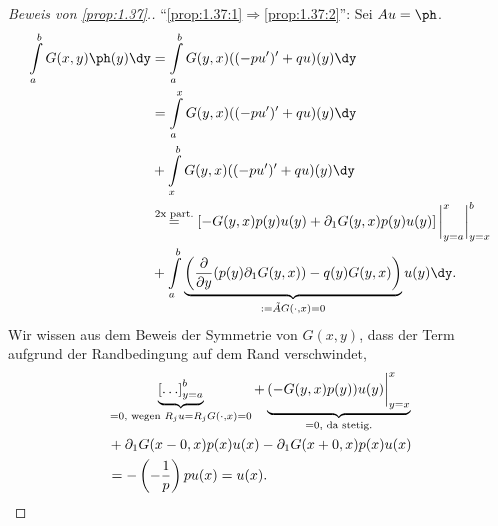 \begin{proof}[Beweis von \ref{prop:1.37}.]
``\ref{prop:1.37:1}$\Rightarrow$\ref{prop:1.37:2}'': Sei $Au = \ph$.
\begin{align*}
\int\limits_a^b G(x,y)\ph(y)\dy &= \int\limits_a^b G(y,x)((-pu')'+qu)(y)\dy\\
&= \int\limits_a^x G(y,x)((-pu')'+qu)(y)\dy \\
&+ \int\limits_x^b G(y,x)((-pu')'+qu)(y)\dy \\
&\overset{\text{2x part.}}{=}
\left[-G(y,x)p(y)u(y) + \partial_1 G(y,x)
p(y)u(y)\right]\bigg|_{y=a}^x\bigg|_{y=x}^b\\ &+ \int\limits_a^b
\underbrace{\left(\frac{\partial}{\partial y}(p(y)\partial_1 G(y,x)) - q(y)G(y,x) \right)}_{:=\tilde{A}G(\cdot,x)=0}u(y)\dy.
\end{align*}
Wir wissen aus dem Beweis der Symmetrie von $G(x,y)$, dass der Term aufgrund
der Randbedingung auf dem Rand verschwindet,
\begin{align*}
&\underbrace{\left[\ldots\right]_{y=a}^b}_{=0,\text{ wegen
}R_ju=R_jG(\cdot,x)=0} +
\underbrace{(-G(y,x)p(y))u(y)\bigg|_{y=x}^x}_{=0,\text{ da stetig}.}\\
&+ \partial_1G(x-0,x)p(x)u(x) - \partial_1 G(x+0,x)p(x)u(x) \\
&= -\left(-\frac{1}{p}\right)p u(x) = u(x).\qedhere
\end{align*}
\end{proof}


